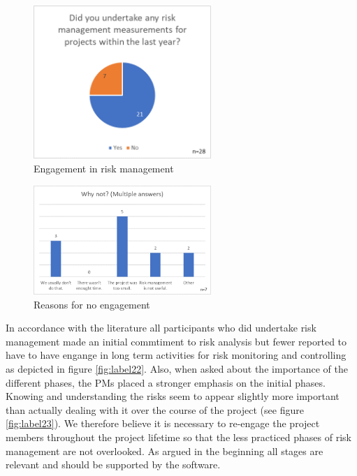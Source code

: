 \begin{figure}[H]
	\centering
	\includegraphics[width=0.6\textwidth]{Assets/survey_results/Q1.png}
	\caption{Engagement in risk management}
	\label{fig:label20}
\end{figure}
\begin{figure}[H]
	\centering
	\includegraphics[width=0.6\textwidth]{Assets/survey_results/Q2.png}
	\caption{Reasons for no engagement}
	\label{fig:label21}
\end{figure}

In accordance with the literature all participants who did undertake risk management made an initial commtiment to risk analysis but fewer reported to have to have engange in long term activities for risk monitoring and controlling as depicted in figure \ref{fig:label22}. Also, when asked about the importance of the different phases, the PMs placed a stronger emphasis on the initial phases. Knowing and understanding the risks seem to appear slightly more important than actually dealing with it over the course of the project (see figure \ref{fig:label23}).  We therefore believe it is necessary to re-engage the project members throughout the project lifetime so that the less practiced phases of risk management are not overlooked. As argued in the beginning all stages are relevant and should be supported by the software.
 
